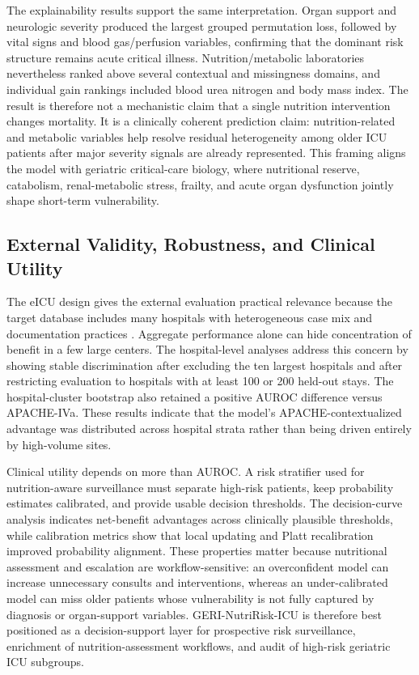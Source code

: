 \documentclass[utf8]{FrontiersinVancouver}
\begin{document}
The explainability results support the same interpretation. Organ support and neurologic severity produced the largest grouped permutation loss, followed by vital signs and blood gas/perfusion variables, confirming that the dominant risk structure remains acute critical illness. Nutrition/metabolic laboratories nevertheless ranked above several contextual and missingness domains, and individual gain rankings included blood urea nitrogen and body mass index. The result is therefore not a mechanistic claim that a single nutrition intervention changes mortality. It is a clinically coherent prediction claim: nutrition-related and metabolic variables help resolve residual heterogeneity among older ICU patients after major severity signals are already represented. This framing aligns the model with geriatric critical-care biology, where nutritional reserve, catabolism, renal-metabolic stress, frailty, and acute organ dysfunction jointly shape short-term vulnerability.

\subsection{External Validity, Robustness, and Clinical Utility}
The eICU design gives the external evaluation practical relevance because the target database includes many hospitals with heterogeneous case mix and documentation practices \citep{Pollard2018EICU}. Aggregate performance alone can hide concentration of benefit in a few large centers. The hospital-level analyses address this concern by showing stable discrimination after excluding the ten largest hospitals and after restricting evaluation to hospitals with at least 100 or 200 held-out stays. The hospital-cluster bootstrap also retained a positive AUROC difference versus APACHE-IVa. These results indicate that the model's APACHE-contextualized advantage was distributed across hospital strata rather than being driven entirely by high-volume sites.

Clinical utility depends on more than AUROC. A risk stratifier used for nutrition-aware surveillance must separate high-risk patients, keep probability estimates calibrated, and provide usable decision thresholds. The decision-curve analysis indicates net-benefit advantages across clinically plausible thresholds, while calibration metrics show that local updating and Platt recalibration improved probability alignment. These properties matter because nutritional assessment and escalation are workflow-sensitive: an overconfident model can increase unnecessary consults and interventions, whereas an under-calibrated model can miss older patients whose vulnerability is not fully captured by diagnosis or organ-support variables. GERI-NutriRisk-ICU is therefore best positioned as a decision-support layer for prospective risk surveillance, enrichment of nutrition-assessment workflows, and audit of high-risk geriatric ICU subgroups.
\end{document}
